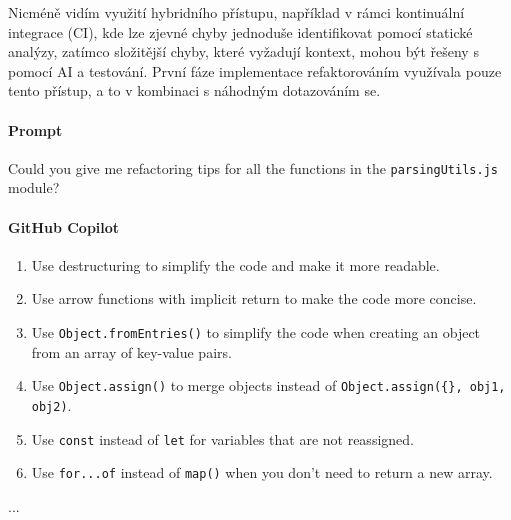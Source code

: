 \documentclass[FM,DP]{tulthesis}
\begin{document}
		Nicméně vidím využití hybridního přístupu, například v rámci kontinuální integrace (CI), kde lze zjevné chyby jednoduše identifikovat pomocí statické analýzy, zatímco složitější chyby, které vyžadují kontext, mohou být řešeny s pomocí AI a testování. První fáze implementace refaktorováním využívala pouze tento přístup, a to v kombinaci s náhodným dotazováním se.
		\vspace{0.6em}
		\begin{tcolorbox}[colback=white,colframe=black]
			\paragraph{Prompt}
			Could you give me refactoring tips for all the functions in the \verb|parsingUtils.js| module?
			
			\vspace{0.6em}
			
			\paragraph{GitHub Copilot}
			\begin{enumerate}
				\item Use destructuring to simplify the code and make it more readable.
				\item Use arrow functions with implicit return to make the code more concise.
				\item Use \verb|Object.fromEntries()| to simplify the code when creating an object from an array of key-value pairs.
				\item Use \verb|Object.assign()| to merge objects instead of \verb|Object.assign({}, obj1, obj2)|.
				\item Use \verb|const| instead of \verb|let| for variables that are not reassigned.
				\item Use \verb|for...of| instead of \verb|map()| when you don't need to return a new array.
			\end{enumerate}
			... \cite{refactoring_simple}
		\end{tcolorbox} 
		
\end{document}
